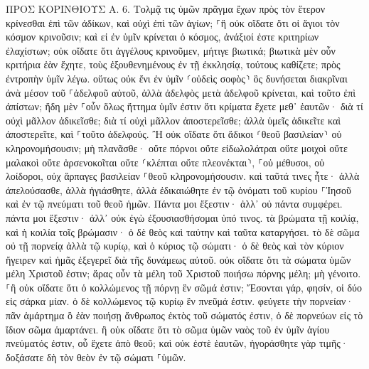 \documentclass[twoside, 9pt]{extreport}
\begin{document}
ΠΡΟΣ ΚΟΡΙΝΘΙΟΥΣ Α.
6.
Τολμᾷ τις ὑμῶν πρᾶγμα ἔχων πρὸς τὸν ἕτερον κρίνεσθαι ἐπὶ τῶν ἀδίκων, καὶ οὐχὶ ἐπὶ τῶν ἁγίων; 
⸀ἢ οὐκ οἴδατε ὅτι οἱ ἅγιοι τὸν κόσμον κρινοῦσιν; καὶ εἰ ἐν ὑμῖν κρίνεται ὁ κόσμος, ἀνάξιοί ἐστε κριτηρίων ἐλαχίστων; 
οὐκ οἴδατε ὅτι ἀγγέλους κρινοῦμεν, μήτιγε βιωτικά; 
βιωτικὰ μὲν οὖν κριτήρια ἐὰν ἔχητε, τοὺς ἐξουθενημένους ἐν τῇ ἐκκλησίᾳ, τούτους καθίζετε; 
πρὸς ἐντροπὴν ὑμῖν λέγω. οὕτως οὐκ ἔνι ἐν ὑμῖν ⸂οὐδεὶς σοφὸς⸃ ὃς δυνήσεται διακρῖναι ἀνὰ μέσον τοῦ ⸀ἀδελφοῦ αὐτοῦ, 
ἀλλὰ ἀδελφὸς μετὰ ἀδελφοῦ κρίνεται, καὶ τοῦτο ἐπὶ ἀπίστων; 
ἤδη μὲν ⸀οὖν ὅλως ἥττημα ὑμῖν ἐστιν ὅτι κρίματα ἔχετε μεθ᾽ ἑαυτῶν· διὰ τί οὐχὶ μᾶλλον ἀδικεῖσθε; διὰ τί οὐχὶ μᾶλλον ἀποστερεῖσθε; 
ἀλλὰ ὑμεῖς ἀδικεῖτε καὶ ἀποστερεῖτε, καὶ ⸀τοῦτο ἀδελφούς. 
Ἢ οὐκ οἴδατε ὅτι ἄδικοι ⸂θεοῦ βασιλείαν⸃ οὐ κληρονομήσουσιν; μὴ πλανᾶσθε· οὔτε πόρνοι οὔτε εἰδωλολάτραι οὔτε μοιχοὶ οὔτε μαλακοὶ οὔτε ἀρσενοκοῖται 
οὔτε ⸂κλέπται οὔτε πλεονέκται⸃, ⸀οὐ μέθυσοι, οὐ λοίδοροι, οὐχ ἅρπαγες βασιλείαν ⸀θεοῦ κληρονομήσουσιν. 
καὶ ταῦτά τινες ἦτε· ἀλλὰ ἀπελούσασθε, ἀλλὰ ἡγιάσθητε, ἀλλὰ ἐδικαιώθητε ἐν τῷ ὀνόματι τοῦ κυρίου ⸀Ἰησοῦ καὶ ἐν τῷ πνεύματι τοῦ θεοῦ ἡμῶν. 
Πάντα μοι ἔξεστιν· ἀλλ᾽ οὐ πάντα συμφέρει. πάντα μοι ἔξεστιν· ἀλλ᾽ οὐκ ἐγὼ ἐξουσιασθήσομαι ὑπό τινος. 
τὰ βρώματα τῇ κοιλίᾳ, καὶ ἡ κοιλία τοῖς βρώμασιν· ὁ δὲ θεὸς καὶ ταύτην καὶ ταῦτα καταργήσει. τὸ δὲ σῶμα οὐ τῇ πορνείᾳ ἀλλὰ τῷ κυρίῳ, καὶ ὁ κύριος τῷ σώματι· 
ὁ δὲ θεὸς καὶ τὸν κύριον ἤγειρεν καὶ ἡμᾶς ἐξεγερεῖ διὰ τῆς δυνάμεως αὐτοῦ. 
οὐκ οἴδατε ὅτι τὰ σώματα ὑμῶν μέλη Χριστοῦ ἐστιν; ἄρας οὖν τὰ μέλη τοῦ Χριστοῦ ποιήσω πόρνης μέλη; μὴ γένοιτο. 
⸀ἢ οὐκ οἴδατε ὅτι ὁ κολλώμενος τῇ πόρνῃ ἓν σῶμά ἐστιν; Ἔσονται γάρ, φησίν, οἱ δύο εἰς σάρκα μίαν. 
ὁ δὲ κολλώμενος τῷ κυρίῳ ἓν πνεῦμά ἐστιν. 
φεύγετε τὴν πορνείαν· πᾶν ἁμάρτημα ὃ ἐὰν ποιήσῃ ἄνθρωπος ἐκτὸς τοῦ σώματός ἐστιν, ὁ δὲ πορνεύων εἰς τὸ ἴδιον σῶμα ἁμαρτάνει. 
ἢ οὐκ οἴδατε ὅτι τὸ σῶμα ὑμῶν ναὸς τοῦ ἐν ὑμῖν ἁγίου πνεύματός ἐστιν, οὗ ἔχετε ἀπὸ θεοῦ; καὶ οὐκ ἐστὲ ἑαυτῶν, 
ἠγοράσθητε γὰρ τιμῆς· δοξάσατε δὴ τὸν θεὸν ἐν τῷ σώματι ⸀ὑμῶν. 
\end{document}
